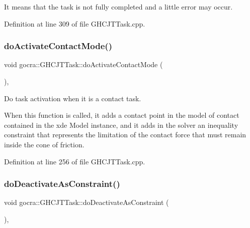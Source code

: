 It means that the task is not fully completed and a little error may occur. 

Definition at line 309 of file G\+H\+C\+J\+T\+Task.\+cpp.

\hypertarget{classgocra_1_1GHCJTTask_a22fe7a1bd0de44d7f51a250baf7796a8}{}\label{classgocra_1_1GHCJTTask_a22fe7a1bd0de44d7f51a250baf7796a8} 
\subsubsection{\texorpdfstring{do\+Activate\+Contact\+Mode()}{doActivateContactMode()}}
{\footnotesize\ttfamily void gocra\+::\+G\+H\+C\+J\+T\+Task\+::do\+Activate\+Contact\+Mode (\begin{DoxyParamCaption}{ }\end{DoxyParamCaption})\hspace{0.3cm}{\ttfamily [protected]}, {\ttfamily [virtual]}}

Do task activation when it is a contact task.

When this function is called, it adds a contact point in the model of contact contained in the xde Model instance, and it adds in the solver an inequality constraint that represents the limitation of the contact force that must remain inside the cone of friction. 

Definition at line 256 of file G\+H\+C\+J\+T\+Task.\+cpp.

\hypertarget{classgocra_1_1GHCJTTask_a2274fda92c62d88a6b4b35286606c41c}{}\label{classgocra_1_1GHCJTTask_a2274fda92c62d88a6b4b35286606c41c} 
\subsubsection{\texorpdfstring{do\+Deactivate\+As\+Constraint()}{doDeactivateAsConstraint()}}
{\footnotesize\ttfamily void gocra\+::\+G\+H\+C\+J\+T\+Task\+::do\+Deactivate\+As\+Constraint (\begin{DoxyParamCaption}{ }\end{DoxyParamCaption})\hspace{0.3cm}{\ttfamily [protected]}, {\ttfamily [virtual]}}

